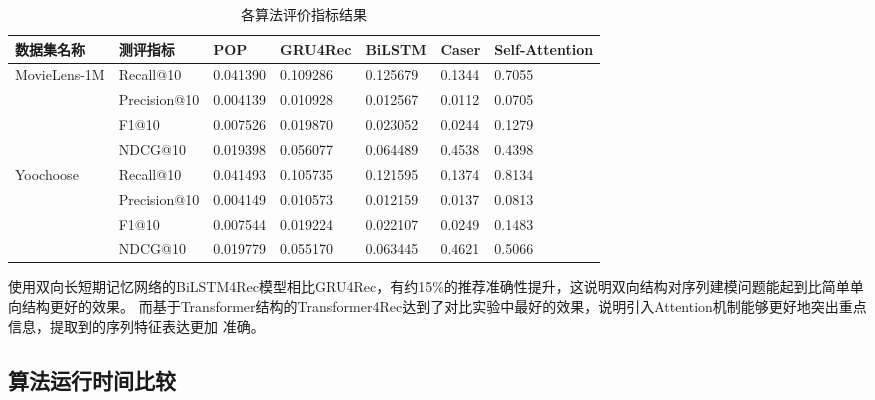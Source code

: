 \begin{table}[]
\centering
\caption{各算法评价指标结果}
\label{table:result}
  \begin{tabular}{@{}lllllll@{}}
  \toprule
  数据集名称                     & 测评指标      & POP      & GRU4Rec  & \textbf{BiLSTM} & Caser & \textbf{Self-Attention} \\ \midrule
  \multirow{4}{*}{MovieLens-1M} & Recall@10    & 0.041390 & 0.109286 & 0.125679 & 0.1344 & 0.7055      \\
                                & Precision@10 & 0.004139 & 0.010928 & 0.012567 & 0.0112 & 0.0705      \\
                                & F1@10        & 0.007526 & 0.019870 & 0.023052 & 0.0244 & 0.1279      \\
                                & NDCG@10      & 0.019398 & 0.056077 & 0.064489 & 0.4538 & 0.4398      \\
  \multirow{4}{*}{Yoochoose}    & Recall@10    & 0.041493 & 0.105735 & 0.121595 & 0.1374 & 0.8134      \\
                                & Precision@10 & 0.004149 & 0.010573 & 0.012159 & 0.0137 & 0.0813      \\
                                & F1@10        & 0.007544 & 0.019224 & 0.022107 & 0.0249 & 0.1483      \\
                                & NDCG@10      & 0.019779 & 0.055170 & 0.063445 & 0.4621 & 0.5066      \\ \cmidrule(l){2-7} 
  \end{tabular}
\end{table}
使用双向长短期记忆网络的BiLSTM4Rec模型相比GRU4Rec，有约15\%的推荐准确性提升，这说明双向结构对序列建模问题能起到比简单单向结构更好的效果。
而基于Transformer结构的Transformer4Rec达到了对比实验中最好的效果，说明引入Attention机制能够更好地突出重点信息，提取到的序列特征表达更加
准确。

\subsection{算法运行时间比较}

